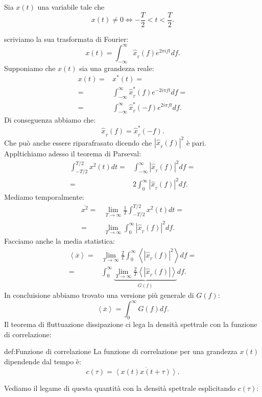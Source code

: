 Sia $x( t) $ una variabile tale che
\[
	x(t) \neq 0 \Longleftrightarrow - \frac{T}{2}<t<\frac{T}{2}
.\] 

scriviamo la sua trasformata di Fourier:
\[
	x( t) 
	=
	\int_{-\infty}^{\infty} \hat{x}_{_T}(f) e^{2\pi i f t} df
.\] 
Supponiamo che $x(t)$ sia una grandezza reale:
\[\begin{aligned}
	x( t) 
	=&
	x^*( t)=\\
	=& 
	\int_{-\infty}^{\infty} \hat{x}^*_{_T} ( f) e^{-2i\pi f t}df=\\
	=&
	\int_{-\infty}^{\infty} \hat{x}^*_{_T} ( -f) e^{2i\pi f t}df
.\end{aligned}\]
Di conseguenza abbiamo che:
\[
	\hat{x}_{_T}(f)=\hat{x}^*_{_T}(-f)
.\] 
Che può anche essere riparafrasato dicendo che $\left| \hat{x}_{_T}(f) \right|^2$ è pari.\\
Appltichiamo adesso il teorema di Parseval:
\[\begin{aligned}
	\int_{-T/2}^{T/2}x^2(t)dt
	=&
	\int_{-\infty}^{\infty} \left| \hat{x}_{_T}(f)\right|^2 df =\\
	=&
	2 \int_{0}^{\infty} \left| \hat{x}_{_T}(f)\right|^2df 
.\end{aligned}\]
Mediamo temporalmente:
\[\begin{aligned}
	\overline{x^2}
	=& 
	\lim_{T \to \infty} \frac{1}{T}\int_{- T /2}^{T /2} x^2( t) dt=\\
	=&
	\lim_{T \to \infty} \int_{0}^{\infty}\left|\hat{x}_{_T}(f)\right|^2 df 
.\end{aligned}\]
Facciamo anche la media statistica:
\[\begin{aligned}
	\left< \overline{x} \right> 
	=&
	\lim_{T \to \infty} \frac{2}{T}\int_{0}^{\infty} 
	\left<\left| \hat{x}_{_T}(f) \right|^2\right>df=\\
	=&
	\int_{0}^{\infty}  
	\underbrace{
	\lim_{T \to \infty}\frac{2}{T}
	\left<\left| \hat{x}_{_T}(f) \right| \right>
	}_{G(f)}
	df
.\end{aligned}\]
In concluisione abbiamo trovato una versione più generale di $G(f)$:
\[
	\left<\overline{x} \right> = \int_{0}^{\infty} G( f) df 
.\] 
Il teorema di fluttuazione dissipazione ci lega la densità spettrale con la funzione di correlazione:
\begin{defn}{def:Funzione di correlazione}
	La funzione di correlazione per una grandezza $x(t)$ dipendende dal tempo è:
	\[
		c(\tau) = \overline{\left<x(t)x(t+\tau)\right>}
	.\] 
\end{defn}
Vediamo il legame di questa quantità con la densità spettrale esplicitando $c(\tau)$:
